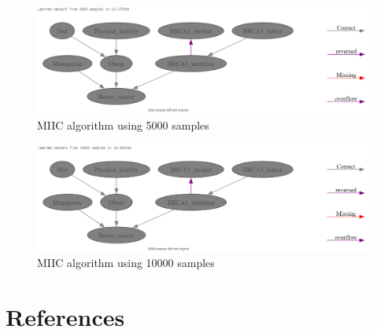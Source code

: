 \documentclass{article}
\begin{document}
\begin{figure}[H]
    \centering
    \includegraphics[width=\textwidth]{../figures/MIIC_5000.png}
    \caption{MIIC algorithm using 5000 samples}
    \label{fig:MIIC5000}
\end{figure}
\begin{figure}[H]
    \centering
    \includegraphics[width=\textwidth]{../figures/MIIC_10000.png}
    \caption{MIIC algorithm using 10000 samples}
    \label{fig:MIIC10000}
\end{figure}
\section{References}


\end{document}
